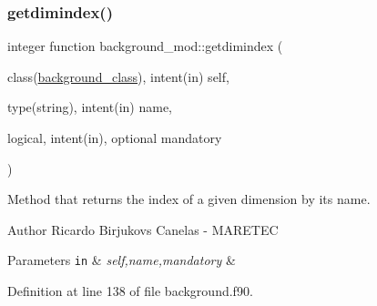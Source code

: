 \subsubsection{\texorpdfstring{getdimindex()}{getdimindex()}}
{\footnotesize\ttfamily integer function background\+\_\+mod\+::getdimindex (\begin{DoxyParamCaption}\item[{class(\mbox{\hyperlink{structbackground__mod_1_1background__class}{background\+\_\+class}}), intent(in)}]{self,  }\item[{type(string), intent(in)}]{name,  }\item[{logical, intent(in), optional}]{mandatory }\end{DoxyParamCaption})\hspace{0.3cm}{\ttfamily [private]}}



Method that returns the index of a given dimension by it\textquotesingle{}s name. 

\begin{DoxyAuthor}{Author}
Ricardo Birjukovs Canelas -\/ M\+A\+R\+E\+T\+EC 
\end{DoxyAuthor}

\begin{DoxyParams}[1]{Parameters}
\mbox{\tt in}  & {\em self,name,mandatory} & \\
\hline
\end{DoxyParams}


Definition at line 138 of file background.\+f90.


